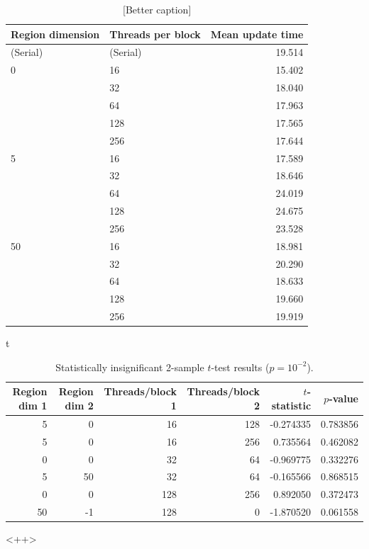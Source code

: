 \documentclass[12pt]{article}
\begin{document}
    \begin{table}
        \centering
        \begin{tabular}{llr}
            \toprule
            Region dimension & Threads per block & Mean update time \\ \midrule
            (Serial)  & (Serial)   &  19.514 \\
            0  & 16  &  15.402 \\
            & 32  &  18.040 \\
            & 64  &  17.963 \\
            & 128 &  17.565 \\
            & 256 &  17.644 \\ \midrule
            5  & 16  &  17.589 \\
            & 32  &  18.646 \\
            & 64  &  24.019 \\
            & 128 &  24.675 \\
            & 256 &  23.528 \\ \midrule
            50 & 16  &  18.981 \\
            & 32  &  20.290 \\
            & 64  &  18.633 \\
            & 128 &  19.660 \\
            & 256 & 19.919 \\ \bottomrule
        \end{tabular}
        \caption{[Better caption]}
        \label{tab:means} t
    \end{table}

    \begin{table}
        \centering
        \begin{tabular}{rrrrrr} \toprule
            Region dim 1 &  Region dim 2  &
            Threads/block 1 &  Threads/block 2 &  $t$-statistic & $p$-value \\ \midrule
 5 &   0  & 16 & 128  &   -0.274335&  0.783856 \\
 5 &   0  & 16 & 256  &    0.735564&  0.462082 \\
 0 &   0  & 32 &  64  &   -0.969775&  0.332276 \\
 5 &  50  & 32 &  64  &   -0.165566&  0.868515 \\
 0 &   0  & 128 & 256 &    0.892050 &  0.372473 \\
50 &  -1  & 128 &   0 &   -1.870520 &  0.061558 \\
\bottomrule
\end{tabular}
        \caption{Statistically insignificant 2-sample $t$-test results ($p =
            10^{-2}$).}
        \label{tab:jj}
    \end{table}<++>
\end{document}
